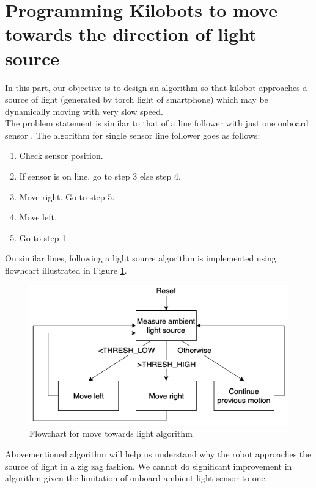 \documentclass{report}[12pt]
\begin{document}
\section{Programming Kilobots to move towards the direction of light source}
In this part, our objective is to design an algorithm so that kilobot approaches a source of light (generated by torch light of smartphone) which may be dynamically moving with very slow speed.\\
The problem statement is similar to that of a line follower with just one onboard sensor \cite{simple-line-follower}. The algorithm for single sensor line follower goes as follows:
\begin{enumerate}
	\item Check sensor position.
	\item If sensor is on line, go to step 3 else step 4.
	\item Move right. Go to step 5.
	\item Move left.
	\item Go to step 1
\end{enumerate}
On similar lines, following a light source algorithm is implemented using flowhcart illustrated in Figure \ref{fig:move_towards_light_algorithm}.
\begin{figure}[H]
	\centering
	\includegraphics[scale=0.5]{images/move_towards_light_algorithm}
	\caption{Flowchart for move towards light algorithm}
	\label{fig:move_towards_light_algorithm}
\end{figure}
Abovementioned algorithm will help us understand why the robot approaches the source of light in a zig zag fashion. We cannot do significant improvement in algorithm given the limitation of onboard ambient light sensor to one.
\end{document}
